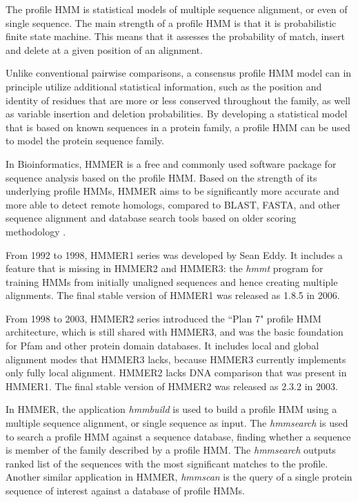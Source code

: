 The profile HMM is statistical models of multiple sequence alignment, or even of single sequence. The main strength of a profile HMM is that it is probabilistic finite state machine. This means that it assesses the probability of match, insert and delete at a given position of an alignment.

Unlike conventional pairwise comparisons, a consensus profile HMM model can in principle utilize additional statistical information, such as the position and identity of residues that are more or less conserved throughout the family, as well as variable insertion and deletion probabilities. By developing a statistical model that is based on known sequences in a protein family, a profile HMM can be used to model the protein sequence family.

In Bioinformatics, HMMER \citep{HMMER} is a free and commonly used software package for sequence analysis based on the profile HMM. 
Based on the strength of its underlying profile HMMs, HMMER aims to be significantly more accurate and more able to detect remote homologs, compared to BLAST, FASTA, and other sequence alignment and database search tools based on older scoring methodology \citep{HMMER3}.

From 1992 to 1998, HMMER1 series was developed by Sean Eddy. It includes a feature that is missing in HMMER2 and HMMER3: the \emph{hmmt} program for training HMMs from initially unaligned sequences and hence creating multiple alignments. The final stable version of HMMER1 was released as 1.8.5 in 2006. 

From 1998 to 2003, HMMER2 series introduced the ``Plan 7" profile HMM architecture, which is still shared with HMMER3, and was the basic foundation for Pfam and other protein domain databases. It includes local and global alignment modes that HMMER3 lacks, because HMMER3 currently implements only fully local alignment. HMMER2 lacks DNA comparison that was present in HMMER1. The final stable version of HMMER2 was released as 2.3.2 in 2003.

In HMMER, the application \emph{hmmbuild} is used to build a profile HMM using a multiple sequence alignment, or single sequence as input. The \emph{hmmsearch} is used to search a profile HMM against a sequence database, finding whether a sequence is member of the family described by a profile HMM. The \emph{hmmsearch} outputs ranked list of the sequences with the most significant matches to the profile. Another similar application in HMMER, \emph{hmmscan} is the query of a single protein sequence of interest against a database of profile HMMs.

